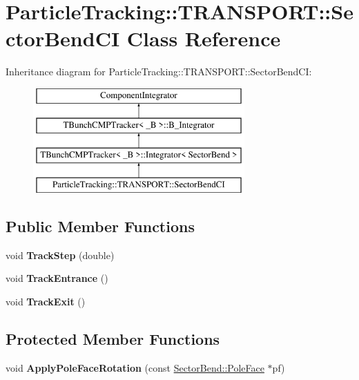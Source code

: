 \hypertarget{classParticleTracking_1_1TRANSPORT_1_1SectorBendCI}{}\section{Particle\+Tracking\+:\+:T\+R\+A\+N\+S\+P\+O\+RT\+:\+:Sector\+Bend\+CI Class Reference}
\label{classParticleTracking_1_1TRANSPORT_1_1SectorBendCI}
Inheritance diagram for Particle\+Tracking\+:\+:T\+R\+A\+N\+S\+P\+O\+RT\+:\+:Sector\+Bend\+CI\+:\begin{figure}[H]
\begin{center}
\leavevmode
\includegraphics[height=4.000000cm]{classParticleTracking_1_1TRANSPORT_1_1SectorBendCI}
\end{center}
\end{figure}
\subsection*{Public Member Functions}
\begin{DoxyCompactItemize}
\item 
\mbox{\label{classParticleTracking_1_1TRANSPORT_1_1SectorBendCI_a7d6f5c96fe3c79a9113a5258d01c1c28}} 
void {\bfseries Track\+Step} (double)
\item 
\mbox{\label{classParticleTracking_1_1TRANSPORT_1_1SectorBendCI_a00df3940759a8b36dddf4a84800588e7}} 
void {\bfseries Track\+Entrance} ()
\item 
\mbox{\label{classParticleTracking_1_1TRANSPORT_1_1SectorBendCI_a42eb7a08d06aafac9a1ebd20d93a74d0}} 
void {\bfseries Track\+Exit} ()
\end{DoxyCompactItemize}
\subsection*{Protected Member Functions}
\begin{DoxyCompactItemize}
\item 
\mbox{\label{classParticleTracking_1_1TRANSPORT_1_1SectorBendCI_a495cd809e397969f0bcf7cdf66e6fac7}} 
void {\bfseries Apply\+Pole\+Face\+Rotation} (const \hyperlink{classSectorBend_1_1PoleFace}{Sector\+Bend\+::\+Pole\+Face} $\ast$pf)
\end{DoxyCompactItemize}
